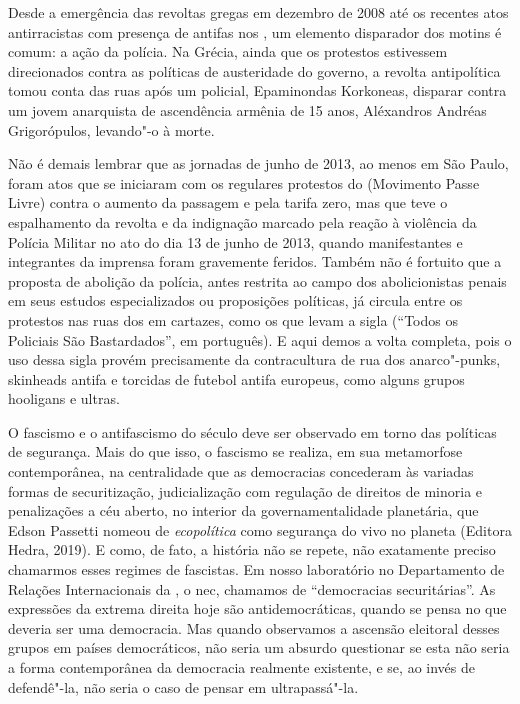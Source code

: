 Desde a emergência das revoltas gregas em dezembro de 2008 até os
recentes atos antirracistas com presença de antifas nos , um elemento
disparador dos motins é comum: a ação da polícia. Na Grécia, ainda que
os protestos estivessem direcionados contra as políticas de austeridade
do governo, a revolta antipolítica tomou conta das ruas após um
policial, Epaminondas Korkoneas, disparar contra um jovem anarquista de
ascendência armênia de 15 anos, Aléxandros Andréas Grigorópulos,
levando"-o à morte.

Não é demais lembrar que as jornadas de junho de 2013, ao menos em São
Paulo, foram atos que se iniciaram com os regulares protestos do 
(Movimento Passe Livre) contra o aumento da passagem e pela tarifa zero,
mas que teve o espalhamento da revolta e da indignação marcado pela
reação à violência da Polícia Militar no ato do dia 13 de junho de 2013,
quando manifestantes e integrantes da imprensa foram gravemente feridos.
Também não é fortuito que a proposta de abolição da polícia, antes
restrita ao campo dos abolicionistas penais em seus estudos
especializados ou proposições políticas, já circula entre os protestos
nas ruas dos  em cartazes, como os que levam a sigla 
(``Todos os Policiais São Bastardados'', em português). E aqui demos a
volta completa, pois o uso dessa sigla provém precisamente da
contracultura de rua dos anarco"-punks, skinheads antifa e torcidas de
futebol antifa europeus, como alguns grupos hooligans e ultras.

O fascismo e o antifascismo do século  deve ser observado em torno
das políticas de segurança. Mais do que isso, o fascismo se realiza, em
sua metamorfose contemporânea, na centralidade que as democracias
concederam às variadas formas de securitização, judicialização com
regulação de direitos de minoria e penalizações a céu aberto, no
interior da governamentalidade planetária, que Edson Passetti nomeou de
\emph{ecopolítica} como segurança do vivo no planeta (Editora Hedra,
2019). E como, de fato, a história não se repete, não exatamente preciso
chamarmos esses regimes de fascistas. Em nosso laboratório no
Departamento de Relações Internacionais da , o nec, chamamos
de ``democracias securitárias''. As expressões da extrema direita hoje
são antidemocráticas, quando se pensa no que deveria ser uma democracia.
Mas quando observamos a ascensão eleitoral desses grupos em países
democráticos, não seria um absurdo questionar se esta não seria a forma
contemporânea da democracia realmente existente, e se, ao invés de
defendê"-la, não seria o caso de pensar em ultrapassá"-la.

